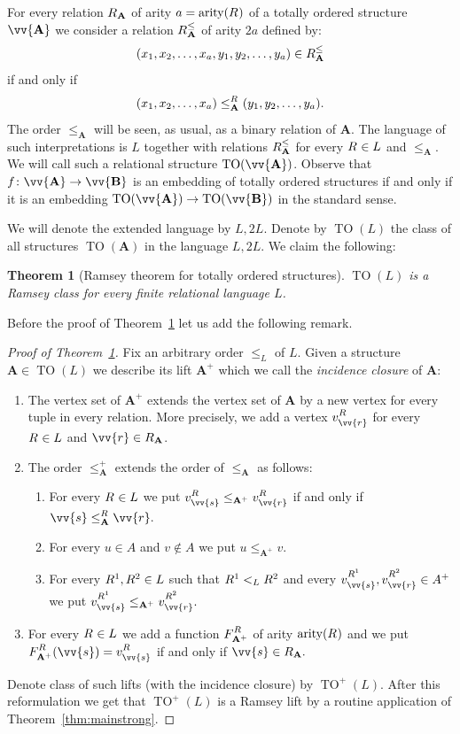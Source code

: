 \documentclass{elsarticle}
\def\TO{\mathop{\mathrm{TO}}\nolimits}
\def\str#1{\mathbf {#1}}
\def\arity#1{\mathop{\mathrm{arity}}\nolimits(\rel{}{#1})}
\def\nbrel#1#2{R\ifstrempty{#1}{}{_{#1}}\ifstrempty{#2}{}{^{#2}}}
\def\rel#1#2{\nbrel{\ifstrempty{#1}{}{\str{#1}}}{#2}}
\def\nbfunc#1#2{F\ifstrempty{#1}{}{_{#1}}\ifstrempty{#2}{}{^{#2}}}
\theoremstyle{plain}
\newtheorem{theorem}{Theorem}[section]
\theoremstyle{definition}
\theoremstyle{remark}
\begin{document}
For every relation $\rel{A}{}$  of arity $a=\arity{}$ of a totally ordered structure $\vv{\str{A}}$ we consider a relation  $\rel{A}{\leq}$ of arity $2a$ defined by:
$$(x_1, x_2,\ldots, x_a,y_1,y_2,\ldots, y_a)\in \rel{A}{\leq}$$ if and only if $$(x_1, x_2,\ldots, x_a)\leq^{\rel{}{}}_\str{A} (y_1, y_2,\ldots, y_a).$$
The order $\leq_\str{A}$ will be seen, as usual, as a binary relation of $\str{A}$.
The language of such interpretations is $L$ together with relations $\rel{A}{\leq}$ for every $\rel{}{}\in L$ and $\leq_\str{A}$. We will call such a relational structure $\TO(\vv{\str{A}})$.
Observe that $f\colon\vv{\str A}\to\vv{\str B}$ is an embedding of totally ordered structures if and only if it is an embedding $\TO(\vv{\str A})\to\TO(\vv{\str B})$ in the standard sense.

We will denote the extended language by $L,2L$.
Denote by $\TO(L)$ the class of all structures $\TO(\str{A})$ in the language $L,2L$.
We claim the following:
\begin{theorem}[Ramsey theorem for totally ordered structures]
\label{thm:TO}
\label{thm:fatorder}
$\TO(L)$ is a Ramsey class for every finite relational language $L$.
\end{theorem}
Before the proof of Theorem~\ref{thm:TO} let us add the following remark.
\begin{proof}[Proof of Theorem~\ref{thm:TO}]
Fix an arbitrary order $\leq_L$ of $L$.
Given a structure $\str{A}\in \TO(L)$ we describe its lift $\str{A}^+$ which we call the \emph{incidence closure} of $\str A$:
\begin{enumerate}
\item The vertex set of $\str{A}^+$ extends the vertex set of $\str{A}$ by a new vertex for every tuple in every relation. More precisely,
we add a vertex
 $v^{\rel{}{}}_{\vv{r}}$ for every $\rel{}{}\in L$ and $\vv{r}\in \rel{A}{}$.
\item The order $\leq_\str{A}^+$ extends the order of $\leq_\str{A}$ as follows:
\begin{enumerate}
\item For every $\rel{}{}\in L$ we put $v^{{\rel{}{}}}_{\vv{s}}\leq_{\str{A}^+}v^{{\rel{}{}}}_{\vv{r}}$ if and only if $\vv{s}\leq^{\rel{}{}}_\str{A} \vv{r}.$
\item For every $u\in A$ and $v\notin A$ we put $u\leq_{\str{A}^+}v$.
\item For every $\rel{}{1},\rel{}{2}\in L$ such that $\rel{}{1}<_L \rel{}{2}$ and every $v^{{\rel{}{1}}}_{\vv{s}}, v^{{\rel{}{2}}}_{\vv{r}}\in A^+$ we put 
$v^{{\rel{}{1}}}_{\vv{s}}\leq_{\str{A}^+}v^{{\rel{}{2}}}_{\vv{r}}.$
\end{enumerate}
\item For every $\rel{}{}\in L$ we add a function $\nbfunc{\str{A}^+}{\rel{}{}}$ of arity $\arity{}$ and we put $\nbfunc{\str{A}^+}{\rel{}{}}(\vv{s})=v^{{\rel{}{}}}_{\vv{s}}$  if and only if $\vv{s}\in \rel{A}{}.$
\end{enumerate}
Denote class of such lifts (with the incidence closure) by $\TO^+(L)$. After this reformulation we get that $\TO^+(L)$ is a Ramsey lift by a routine application of Theorem~\ref{thm:mainstrong}.
\end{proof}
\end{document}
